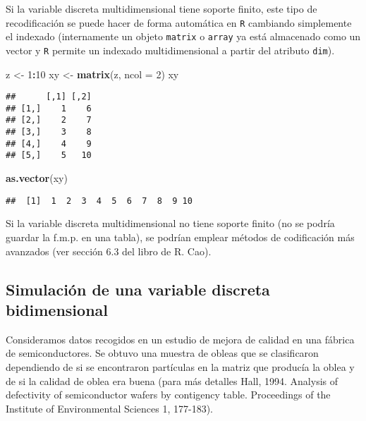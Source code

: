 \documentclass[
]{book}
\newenvironment{Shaded}{\begin{snugshade}}{\end{snugshade}}
\newcommand{\DataTypeTok}[1]{\textcolor[rgb]{0.13,0.29,0.53}{#1}}
\newcommand{\DecValTok}[1]{\textcolor[rgb]{0.00,0.00,0.81}{#1}}
\newcommand{\KeywordTok}[1]{\textcolor[rgb]{0.13,0.29,0.53}{\textbf{#1}}}
\newcommand{\NormalTok}[1]{#1}
\newcommand{\OperatorTok}[1]{\textcolor[rgb]{0.81,0.36,0.00}{\textbf{#1}}}
\newcommand{\StringTok}[1]{\textcolor[rgb]{0.31,0.60,0.02}{#1}}
\theoremstyle{break}
\theoremstyle{definition}
\theoremstyle{definition}
\theoremstyle{definition}
\theoremstyle{remark}
\begin{document}
Si la variable discreta multidimensional tiene soporte finito, este tipo de recodificación
se puede hacer de forma automática en \texttt{R} cambiando simplemente el indexado
(internamente un objeto \texttt{matrix} o \texttt{array} ya está almacenado como un vector y
\texttt{R} permite un indexado multidimensional a partir del atributo \texttt{dim}).

\begin{Shaded}
\begin{Highlighting}[]
\NormalTok{z <-}\StringTok{ }\DecValTok{1}\OperatorTok{:}\DecValTok{10}
\NormalTok{xy <-}\StringTok{ }\KeywordTok{matrix}\NormalTok{(z, }\DataTypeTok{ncol =} \DecValTok{2}\NormalTok{)}
\NormalTok{xy}
\end{Highlighting}
\end{Shaded}

\begin{verbatim}
##      [,1] [,2]
## [1,]    1    6
## [2,]    2    7
## [3,]    3    8
## [4,]    4    9
## [5,]    5   10
\end{verbatim}

\begin{Shaded}
\begin{Highlighting}[]
\KeywordTok{as.vector}\NormalTok{(xy)}
\end{Highlighting}
\end{Shaded}

\begin{verbatim}
##  [1]  1  2  3  4  5  6  7  8  9 10
\end{verbatim}

Si la variable discreta multidimensional no tiene soporte finito
(no se podría guardar la f.m.p. en una tabla), se podrían emplear
métodos de codificación más avanzados (ver sección 6.3 del libro de R. Cao).

\hypertarget{simulaciuxf3n-de-una-variable-discreta-bidimensional}{%
\subsection{Simulación de una variable discreta bidimensional}\label{simulaciuxf3n-de-una-variable-discreta-bidimensional}}

Consideramos datos recogidos en un estudio de mejora de calidad en una fábrica de semiconductores.
Se obtuvo una muestra de obleas que se clasificaron dependiendo de si se encontraron partículas
en la matriz que producía la oblea y de si la calidad de oblea era buena
(para más detalles Hall, 1994. Analysis of defectivity of semiconductor wafers by contigency table.
Proceedings of the Institute of Environmental Sciences 1, 177-183).
\end{document}
